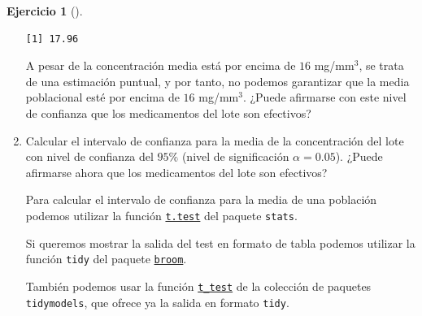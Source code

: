 \documentclass[
  a4paper,
]{scrreport}
\newenvironment{Shaded}{\begin{snugshade}}{\end{snugshade}}
\newcommand{\FunctionTok}[1]{\textcolor[rgb]{0.28,0.35,0.67}{#1}}
\newcommand{\NormalTok}[1]{\textcolor[rgb]{0.00,0.23,0.31}{#1}}
\newcommand{\SpecialCharTok}[1]{\textcolor[rgb]{0.37,0.37,0.37}{#1}}
\theoremstyle{definition}
\newtheorem{exercise}{Ejercicio}[chapter]
\theoremstyle{remark}
\begin{document}
\begin{exercise}[]
\begin{enumerate}
\begin{tcolorbox}
\begin{Shaded}
\end{Shaded}

\begin{verbatim}
[1] 17.96
\end{verbatim}

  A pesar de la concentración media está por encima de \(16\)
  mg/mm\(^3\), se trata de una estimación puntual, y por tanto, no
  podemos garantizar que la media poblacional esté por encima de \(16\)
  mg/mm\(^3\). ¿Puede afirmarse con este nivel de confianza que los
  medicamentos del lote son efectivos?

  \end{tcolorbox}
\item
  Calcular el intervalo de confianza para la media de la concentración
  del lote con nivel de confianza del \(95\%\) (nivel de significación
  \(\alpha =0.05\)). ¿Puede afirmarse ahora que los medicamentos del
  lote son efectivos?

  \begin{tcolorbox}[enhanced jigsaw, breakable, toptitle=1mm, colbacktitle=quarto-callout-note-color!10!white, rightrule=.15mm, opacityback=0, opacitybacktitle=0.6, titlerule=0mm, coltitle=black, colframe=quarto-callout-note-color-frame, colback=white, bottomtitle=1mm, leftrule=.75mm, toprule=.15mm, title=\textcolor{quarto-callout-note-color}{\faInfo}\hspace{0.5em}{Ayuda}, arc=.35mm, bottomrule=.15mm, left=2mm]

  Para calcular el intervalo de confianza para la media de una población
  podemos utilizar la función
  \href{https://www.rdocumentation.org/packages/stats/versions/3.6.2/topics/t.test}{\texttt{t.test}}
  del paquete \texttt{stats}.

  Si queremos mostrar la salida del test en formato de tabla podemos
  utilizar la función \texttt{tidy} del paquete
  \href{https://broom.tidymodels.org/index.html}{\texttt{broom}}.

  También podemos usar la función
  \href{https://infer.tidymodels.org/reference/t_test.html?q=t_test\#null}{\texttt{t\_test}}
  de la colección de paquetes \texttt{tidymodels}, que ofrece ya la
  salida en formato \texttt{tidy}.

  \end{tcolorbox}


\end{enumerate}
\end{exercise}
\end{document}
